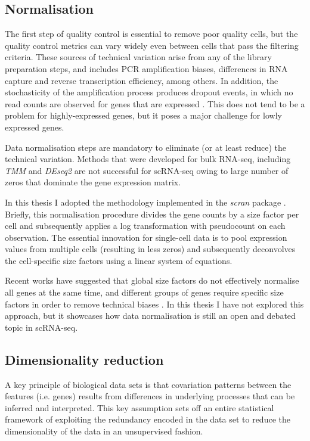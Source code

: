 \subsection{Normalisation}

The first step of quality control is essential to remove poor quality cells, but the quality control metrics can vary widely even between cells that pass the filtering criteria. These sources of technical variation arise from any of the library preparation steps, and includes PCR amplification biases, differences in RNA capture and reverse transcription efficiency, among others. In addition, the stochasticity of the amplification process produces dropout events, in which no read counts are observed for genes that are expressed \cite{VandenBerge2018}. This does not tend to be a problem for highly-expressed genes, but it poses a major challenge for lowly expressed genes.

Data normalisation steps are mandatory to eliminate (or at least reduce) the technical variation. Methods that were developed for bulk RNA-seq, including \textit{TMM} \cite{Robinson2010} and \textit{DEseq2} \cite{Love2014} are not successful for scRNA-seq owing to large number of zeros that dominate the gene expression matrix.

In this thesis I adopted the methodology implemented in the \textit{scran} package \cite{Lun2016a}. Briefly, this normalisation procedure divides the gene counts by a size factor per cell and subsequently applies a log transformation with pseudocount on each observation. The essential innovation for single-cell data is to pool expression values from multiple cells (resulting in less zeros) and subsequently deconvolves the cell-specific size factors using a linear system of equations.

Recent works have suggested that global size factors do not effectively normalise all genes at the same time, and different groups of genes require specific size factors in order to remove technical biases \cite{Hafemeister2019}. In this thesis I have not explored this approach, but it showcases how data normalisation is still an open and debated topic in scRNA-seq.

\subsection{Dimensionality reduction}

A key principle of biological data sets is that covariation patterns between the features (i.e. genes) results from differences in underlying processes that can be inferred and interpreted. This key assumption sets off an entire statistical framework of exploiting the redundancy encoded in the data set to reduce the dimensionality of the data in an unsupervised fashion.

